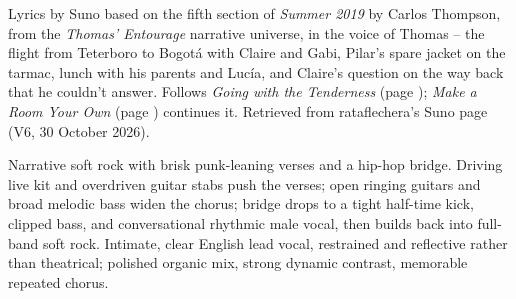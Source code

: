 
\label{sec:between-the-ground-and-the-clouds}
\begin{notes}
Lyrics by Suno based on the fifth section of \emph{Summer 2019} by Carlos Thompson, from the \emph{Thomas' Entourage} narrative universe, in the voice of Thomas -- the flight from Teterboro to Bogotá with Claire and Gabi, Pilar's spare jacket on the tarmac, lunch with his parents and Lucía, and Claire's question on the way back that he couldn't answer. Follows \emph{Going with the Tenderness} (page \pageref{sec:going-with-the-tenderness}); \emph{Make a Room Your Own} (page \pageref{sec:make-a-room-your-own}) continues it. Retrieved from rataflechera's Suno page (V6, 30 October 2026).
\end{notes}
\begin{style}
Narrative soft rock with brisk punk-leaning verses and a hip-hop bridge. Driving live kit and overdriven guitar stabs push the verses; open ringing guitars and broad melodic bass widen the chorus; bridge drops to a tight half-time kick, clipped bass, and conversational rhythmic male vocal, then builds back into full-band soft rock. Intimate, clear English lead vocal, restrained and reflective rather than theatrical; polished organic mix, strong dynamic contrast, memorable repeated chorus.
\end{style}
